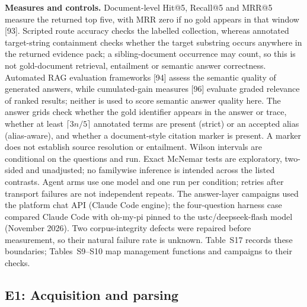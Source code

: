 \documentclass[11pt]{article}
\begin{document}
\textbf{Measures and controls.} Document-level Hit@5, Recall@5 and MRR@5
measure the returned top five, with MRR zero if no gold appears in that
window [93]. Scripted route accuracy checks the
labelled collection, whereas annotated target-string containment checks
whether the target substring occurs anywhere in the returned evidence pack;
a sibling-document occurrence may count, so this is not gold-document
retrieval, entailment or semantic answer correctness. Automated RAG evaluation frameworks [94] assess the semantic quality of generated answers,
while cumulated-gain measures [96] evaluate
graded relevance of ranked results; neither is used to score semantic answer
quality here. The answer grids check whether the gold identifier appears in
the answer or trace, whether at least $\lceil3n/5\rceil$ annotated terms are
present (strict) or an accepted alias (alias-aware), and whether a
document-style citation marker is present. A marker does not establish source
resolution or entailment. Wilson intervals are conditional on the questions
and run. Exact McNemar tests are exploratory, two-sided and unadjusted; no
familywise inference is intended across the listed contrasts. Agent arms use
one model and one run per condition; retries after transport failures are
not independent repeats. The answer-layer campaigns used the platform chat
API (Claude Code engine); the four-question harness case compared Claude
Code with oh-my-pi pinned to the ustc/deepseek-flash model (November 2026).
Two corpus-integrity defects were
repaired before measurement, so their natural failure rate is unknown.
Table~S17 records these boundaries; Tables~S9--S10 map
management functions and campaigns to their checks.

\subsection{E1: Acquisition and parsing}
\end{document}
